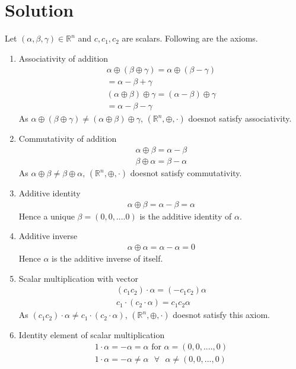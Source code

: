 \documentclass[journal,12pt,twocolumn]{IEEEtran}
\begin{document}
\section{Solution}
Let $(\alpha,\beta,\gamma)\in \mathbb{R}^n$  and $c,c_1,c_2$ are scalars. Following are the axioms.
\begin{enumerate}
\item Associativity of addition
\begin{align}
\alpha\oplus(\beta\oplus\gamma)=\alpha\oplus(\beta-\gamma)\\=\alpha-\beta+\gamma\\
(\alpha\oplus\beta)\oplus\gamma=(\alpha-\beta)\oplus\gamma\\=\alpha-\beta-\gamma
\end{align}
As $\alpha\oplus(\beta\oplus\gamma)\neq (\alpha\oplus\beta)\oplus\gamma$,  $(\mathbb{R}^n,\oplus,\cdot)$ doesnot satisfy associativity.
\item Commutativity of addition
\begin{align}
\alpha\oplus\beta=\alpha-\beta\\
\beta\oplus\alpha=\beta-\alpha
\end{align}
As $\alpha\oplus\beta\neq\beta\oplus\alpha$,  $(\mathbb{R}^n,\oplus,\cdot)$ doesnot satisfy commutativity.
\item Additive identity
\begin{align}
\alpha\oplus\beta=\alpha-\beta=\alpha
\end{align}
Hence a unique $\beta=(0,0,....0)$ is the additive identity of $\alpha$.
\item Additive inverse
\begin{align}
\alpha\oplus\alpha=\alpha-\alpha=0
\end{align}
Hence $\alpha$ is the additive inverse of itself.
\item Scalar multiplication with vector
\begin{align}
(c_1c_2)\cdot\alpha=(-c_1c_2)\alpha\\
c_1\cdot(c_2\cdot\alpha)=c_1c_2\alpha
\end{align} 
As  $(c_1c_2)\cdot\alpha\neq c_1\cdot(c_2\cdot\alpha)$, $(\mathbb{R}^n,\oplus,\cdot)$ doesnot satisfy this axiom.
\item Identity element of scalar multiplication
\begin{align}
1\cdot\alpha=-\alpha=\alpha \text{ for } \alpha=(0,0,....,0)\\
1\cdot\alpha=-\alpha\neq \alpha \text{ $\forall$ } \alpha\neq(0,0,...,0) 
\end{align}

\end{enumerate}
\end{document}

